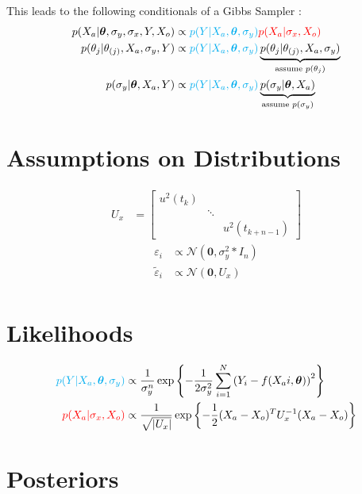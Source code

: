 \documentclass[10pt]{article}
\renewcommand{\vec}[1]{\boldsymbol{#1}}
\newcommand{\mat}[1]{#1}
\begin{document}
    This leads to the following conditionals of a Gibbs Sampler \cite{dellaportas_1995}:
    \begin{align}
        p(X_a | \vec{\theta}, \sigma_y, \sigma_x, Y, X_o) &\propto {\color{cyan} p(Y | X_a, \vec{\theta}, \sigma_y)} {\color{red} p(X_a | \sigma_x, X_o)} \\
        p(\theta_j | \theta_{(j)}, X_a, \sigma_y, Y) &\propto {\color{cyan} p(Y | X_a, \vec{\theta}, \sigma_y)} \underbrace{p(\theta_j | \theta_{(j)}, X_a, \sigma_{y})}_{\text{assume } p(\theta_j)} \\
        p(\sigma_y | \vec{\theta}, X_a, Y) &\propto {\color{cyan} p(Y | X_a, \vec{\theta}, \sigma_y)} \underbrace{p(\sigma_y | \vec{\theta}, X_a)}_{\text{assume } p(\sigma_y)} 
    \end{align}
    
    
    \section{Assumptions on Distributions}
    \begin{align}
        \mat{U_x} &= \begin{bmatrix} u^2(t_k) && \\ &\ddots& \\ && u^2(t_{k+n-1}) \end{bmatrix} 
    \end{align}
    \begin{align}
        \varepsilon_i &\propto \mathcal{N}(\vec{0}, \sigma_y^2 * I_n)\\
        \tilde{\varepsilon}_i &\propto \mathcal{N}(\vec{0}, \mat{U_x}) \\
    \end{align}
    
    
    \section{Likelihoods}
    \begin{align}
        {\color{cyan} p(Y | X_a, \vec{\theta}, \sigma_y)} &\propto \frac{1}{\sigma_y^n} \exp\left\{ - \frac{1}{2\sigma_y^2} \sum_{i=1}^N \left( Y_i - f(X_ai, \vec{\theta}) \right)^2 \right\} \\
        {\color{red} p(X_a | \sigma_x, X_o)} &\propto \frac{1}{\sqrt{|\mat{U_x}|}} \exp\left\{ - \frac{1}{2} (X_a - X_o)^T \mat{U_x}^{-1} (X_a - X_o) \right\}
    \end{align}    
    
    \section{Posteriors}
\end{document}
